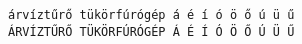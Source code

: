 \documentclass{report}
\begin{document}
\begin{lstlisting}
árvíztűrő tükörfúrógép á é í ó ö ő ú ü ű
ÁRVÍZTŰRŐ TÜKÖRFÚRÓGÉP Á É Í Ó Ö Ő Ú Ü Ű
\end{lstlisting}
\end{document}
